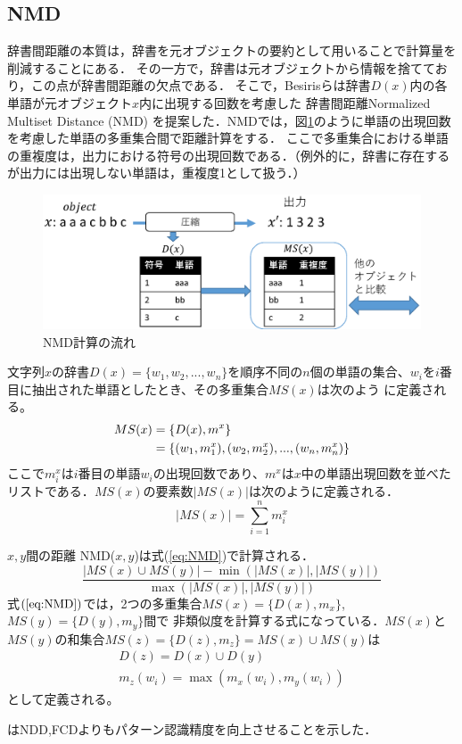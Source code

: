 \subsection{NMD} %
\label{sec:nmd}
辞書間距離の本質は，辞書を元オブジェクトの要約として用いることで計算量を削減することにある．
その一方で，辞書は元オブジェクトから情報を捨てており，この点が辞書間距離の欠点である．
そこで，Besirisらは辞書$D(x)$内の各単語が元オブジェクト$x$内に出現する回数を考慮した
辞書間距離Normalized Multiset Distance (NMD) \cite{NMD}を提案した．NMDでは，図\ref{fig:image/CalcNMD.eps}のように単語の出現回数を考慮した単語の多重集合間で距離計算をする．
ここで多重集合における単語の重複度は，出力における符号の出現回数である．（例外的に，辞書に存在するが出力には出現しない単語は，重複度1として扱う．）
\begin{figure}[tb]
\begin{center}
\includegraphics[clip, width=\columnwidth]{image/CalcNMD.eps}
\caption{NMD計算の流れ}
\label{fig:image/CalcNMD.eps}
\end{center}
\end{figure}

文字列$x$の辞書$D(x) = \{w_1,w_2,...,w_n\}$を順序不同の$n$個の単語の集合、$w_i$を$i$番目に抽出された単語としたとき、その多重集合$MS(x)$は次のよう
に定義される。
\begin{align}
MS(x)
&= \{D(x),m^x\} \notag \\
&= \{(w_1,m_1^x),(w_2,m_2^x),...,(w_n,m_n^x)\}
\end{align}
ここで$m_i^x$は$i$番目の単語$w_i$の出現回数であり、$m^x$は$x$中の単語出現回数を並べたリストである．$MS(x)$の要素数$|MS(x)|$は次のように定義される．
\begin{equation}
|MS(x)| = \sum_{i=1}^n m_i^x
\end{equation}

$x,y$間の距離 NMD($x,y$)は式(\ref{eq:NMD})で計算される．
\begin{equation}
\frac{|MS(x)\cup MS(y)| - \min(|MS(x)|,|MS(y)|)}{\max(|MS(x)|,|MS(y)|)}
\label{eq:NMD}
\end{equation}
式$(\ref{eq:NMD})$では，2つの多重集合$MS(x) = \{D(x),m_x\}$, $MS(y) = \{D(y),m_y\} $間で
非類似度を計算する式になっている．$MS(x)$と$MS(y)$の和集合$MS(z)= \{D(z),m_z\}=
MS(x)\cup MS(y)$は
\begin{gather}
\label{eq:x_cup_y_0}
D(z) = D(x)\cup D(y) \\\label{eq:x_cup_y_1}
m_z(w_i) = \max(m_x(w_i),m_y(w_i))
\end{gather}
として定義される。



\cite{NMD}はNDD,FCDよりもパターン認識精度を向上させることを示した．
